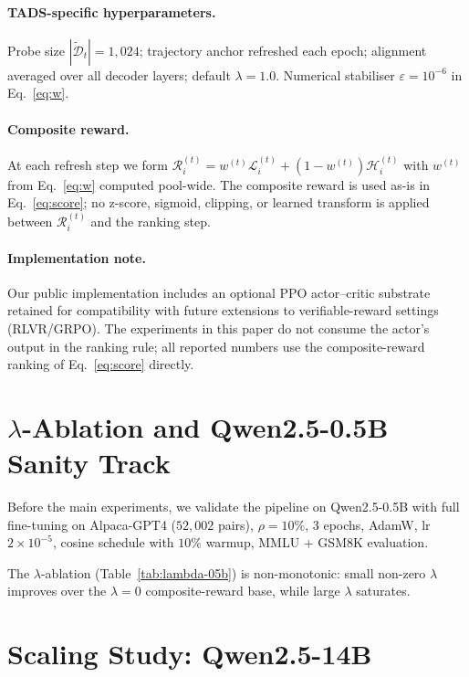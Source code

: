 \paragraph{\textsc{TADS}-specific hyperparameters.}
Probe size $|\widetilde{\mathcal{D}}_t|=1{,}024$; trajectory anchor
refreshed each epoch; alignment averaged over all decoder layers;
default $\lambda=1.0$. Numerical stabiliser $\varepsilon=10^{-6}$
in Eq.~\ref{eq:w}.

\paragraph{Composite reward.}
At each refresh step we form
$\mathcal{R}_i^{(t)} = w^{(t)}\mathcal{L}_i^{(t)} +
(1-w^{(t)})\mathcal{H}_i^{(t)}$
with $w^{(t)}$ from Eq.~\ref{eq:w} computed pool-wide. The composite
reward is used as-is in Eq.~\ref{eq:score}; no z-score, sigmoid,
clipping, or learned transform is applied between $\mathcal{R}_i^{(t)}$
and the ranking step.

\paragraph{Implementation note.}
Our public implementation includes an optional PPO actor--critic
substrate retained for compatibility with future extensions to
verifiable-reward settings (RLVR/GRPO). The experiments in this
paper do not consume the actor's output in the ranking rule; all
reported numbers use the composite-reward ranking of
Eq.~\ref{eq:score} directly.

\section{$\lambda$-Ablation and Qwen2.5-0.5B Sanity Track}
\label{app:setup-validation}

Before the main experiments, we validate the pipeline on
Qwen2.5-0.5B with full fine-tuning on Alpaca-GPT4 ($52{,}002$ pairs),
$\rho=10\%$, 3 epochs, AdamW, lr $2\times10^{-5}$, cosine schedule
with $10\%$ warmup, MMLU + GSM8K evaluation.

The $\lambda$-ablation (Table~\ref{tab:lambda-05b}) is
non-monotonic: small non-zero $\lambda$ improves over the
$\lambda=0$ composite-reward base, while large $\lambda$
saturates.

\section{Scaling Study: Qwen2.5-14B}
\label{app:scaling}

